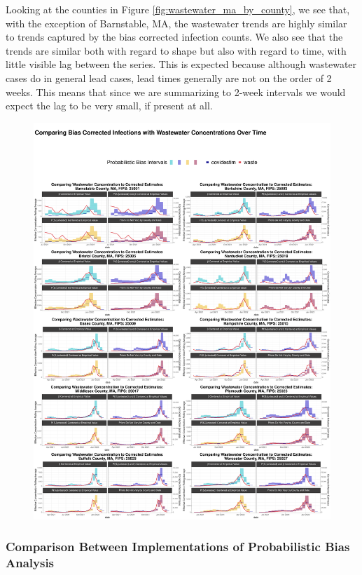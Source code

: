 \documentclass[12pt,twoside]{smiththesis}
\begin{document}
Looking at the counties in Figure \ref{fig:wastewater_ma_by_county}, we see that, with the exception of Barnstable, MA, the wastewater trends are highly similar to trends captured by the bias corrected infection counts. We also see that the trends are similar both with regard to shape but also with regard to time, with little visible lag between the series. This is expected because although wastewater cases do in general lead cases, lead times generally are not on the order of 2 weeks. This means that since we are summarizing to 2-week intervals we would expect the lag to be very small, if present at all.
\begin{figure}
\includegraphics[width=1\linewidth]{figure/wastewater_ma_by_county} \caption{\label{fig:wastewater_ma_by_county}}\label{fig:unnamed-chunk-8}
\end{figure}
\hypertarget{comparison-between-implementations-of-probabilistic-bias-analysis}{%
\subsubsection{Comparison Between Implementations of Probabilistic Bias Analysis}\label{comparison-between-implementations-of-probabilistic-bias-analysis}}
\end{document}
